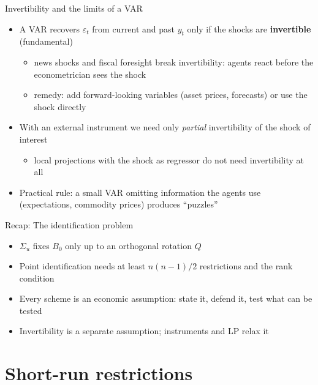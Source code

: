 \begin{frame}{Invertibility and the limits of a VAR}
\itemsize{\small}
\begin{itemize}
    \item A VAR recovers $\varepsilon_t$ from current and past $y_t$ only if the shocks are \textbf{invertible} (fundamental)
    \begin{itemize}
        \item news shocks and fiscal foresight break invertibility: agents react before the econometrician sees the shock
        \item remedy: add forward-looking variables (asset prices, forecasts) or use the shock directly 
    \end{itemize}
    \item With an external instrument we need only \emph{partial} invertibility of the shock of interest 
    \begin{itemize}
        \item local projections with the shock as regressor do not need invertibility at all 
    \end{itemize}
    \item Practical rule: a small VAR omitting information the agents use (expectations, commodity prices) produces ``puzzles''
\end{itemize}
\end{frame}

\begin{frame}{Recap: The identification problem}
\itemsize{\small}
\begin{itemize}
    \item $\Sigma_u$ fixes $B_0$ only up to an orthogonal rotation $Q$
    \item Point identification needs at least $n(n - 1)/2$ restrictions and the rank condition
    \item Every scheme is an economic assumption: state it, defend it, test what can be tested
    \item Invertibility is a separate assumption; instruments and LP relax it
\end{itemize}
\end{frame}


\section{Short-run restrictions}

